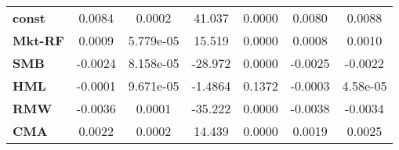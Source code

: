 \begin{center}
\begin{tabular}{lcccccc}
\midrule
\textbf{const}  &       0.0084       &       0.0002       &      41.037     &      0.0000      &       0.0080      &       0.0088       \\
\textbf{Mkt-RF} &       0.0009       &     5.779e-05      &      15.519     &      0.0000      &       0.0008      &       0.0010       \\
\textbf{SMB}    &      -0.0024       &     8.158e-05      &     -28.972     &      0.0000      &      -0.0025      &      -0.0022       \\
\textbf{HML}    &      -0.0001       &     9.671e-05      &     -1.4864     &      0.1372      &      -0.0003      &      4.58e-05      \\
\textbf{RMW}    &      -0.0036       &       0.0001       &     -35.222     &      0.0000      &      -0.0038      &      -0.0034       \\
\textbf{CMA}    &       0.0022       &       0.0002       &      14.439     &      0.0000      &       0.0019      &       0.0025       \\
\bottomrule
\end{tabular}
\end{center}
